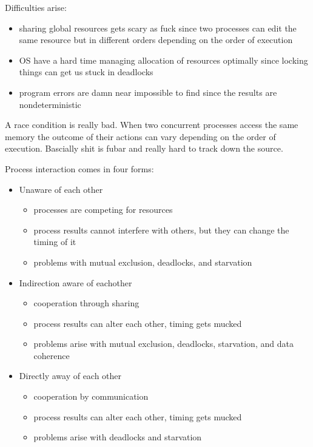 \documentclass[12pt]{article}
\begin{document}
Difficulties arise:
\begin{itemize}
    \item sharing global resources gets scary as fuck since two processes can edit the same resource but in different orders depending on the order of execution
    \item OS have a hard time managing allocation of resources optimally since locking things can get us stuck in deadlocks
    \item program errors are damn near impossible to find since the results are nondeterministic
\end{itemize}

A race condition is really bad. When two concurrent processes access the same memory the outcome of their actions can vary depending on the order of execution. Bascially shit is fubar and really hard to track down the source.

Process interaction comes in four forms:
\begin{itemize}
    \item Unaware of each other
    \begin{itemize}
        \item processes are competing for resources
        \item process results cannot interfere with others, but they can change the timing of it
        \item problems with mutual exclusion, deadlocks, and starvation
    \end{itemize}
    \item Indirection aware of eachother
    \begin{itemize}
        \item cooperation through sharing
        \item process results can alter each other, timing gets mucked
        \item problems arise with mutual exclusion, deadlocks, starvation, and data coherence
    \end{itemize}
    \item Directly away of each other
    \begin{itemize}
        \item cooperation by communication
        \item process results can alter each other, timing gets mucked
        \item problems arise with deadlocks and starvation
    \end{itemize}
\end{itemize}
\end{document}
